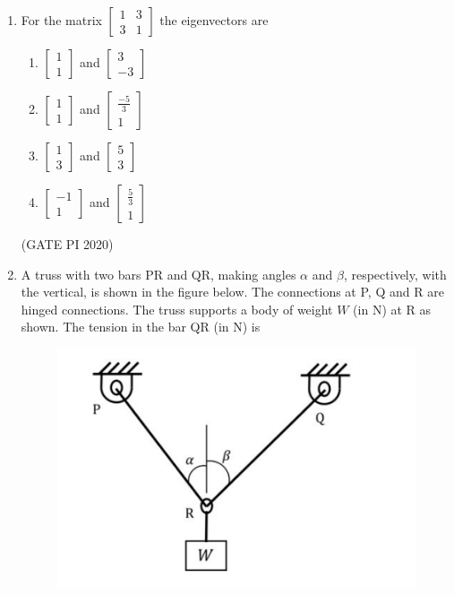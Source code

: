 \documentclass[journal,12pt,onecolumn]{IEEEtran}
\theoremstyle{remark}
\begin{document}
\begin{enumerate}
\item For the matrix
$
\begin{bmatrix}
1 & 3 \\
3 & 1
\end{bmatrix}
$
the eigenvectors are
\begin{enumerate}
    \item $\begin{bmatrix} 1 \\ 1 \end{bmatrix}$ and $\begin{bmatrix} 3 \\ -3\end{bmatrix}$
    \item $\begin{bmatrix} 1 \\ 1 \end{bmatrix}$ and $\begin{bmatrix} \frac{-5}{3} \\ 1 \end{bmatrix}$
    \item $\begin{bmatrix} 1 \\ 3 \end{bmatrix}$ and $\begin{bmatrix} 5 \\ 3 \end{bmatrix}$
     \item $\begin{bmatrix} -1 \\ 1 \end{bmatrix}$ and $\begin{bmatrix} \frac{5}{3} \\ 1 \end{bmatrix}$
\end{enumerate}

\hfill (GATE PI 2020)

\item A truss with two bars PR and QR, making angles $\alpha$ and $\beta$, respectively, with the vertical, is shown in the figure below. The connections at P, Q and R are hinged connections. The truss supports a body of weight $W$ (in N) at R as shown. The tension in the bar QR (in N) is

\begin{figure}[h]
    \centering
    \includegraphics[width=0.5\columnwidth]{figs/fig11.png}
    \caption{}
    \label{fig:placeholder}
\end{figure}


\end{enumerate}
\end{document}
